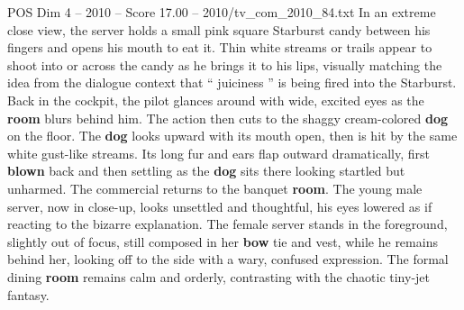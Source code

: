 \begin{textsample}{POS Dim 4 – 2010 – Score 17.00 – 2010/tv\_com\_2010\_84.txt}
In an extreme close view, the server holds a small pink square Starburst candy between his fingers and opens his mouth to eat it.
Thin white streams or trails appear to shoot into or across the candy as he brings it to his lips, visually matching the idea from the dialogue context that “ juiciness ” is being fired into the Starburst.
Back in the cockpit, the pilot glances around with wide, excited eyes as the \textbf{room} blurs behind him.
The action then cuts to the shaggy cream-colored \textbf{dog} on the floor.
The \textbf{dog} looks upward with its mouth open, then is hit by the same white gust-like streams.
Its long fur and ears flap outward dramatically, first \textbf{blown} back and then settling as the \textbf{dog} sits there looking startled but unharmed.
The commercial returns to the banquet \textbf{room}.
The young male server, now in close-up, looks unsettled and thoughtful, his eyes lowered as if reacting to the bizarre explanation.
The female server stands in the foreground, slightly out of focus, still composed in her \textbf{bow} tie and vest, while he remains behind her, looking off to the side with a wary, confused expression.
The formal dining \textbf{room} remains calm and orderly, contrasting with the chaotic tiny-jet fantasy.

\end{textsample}
